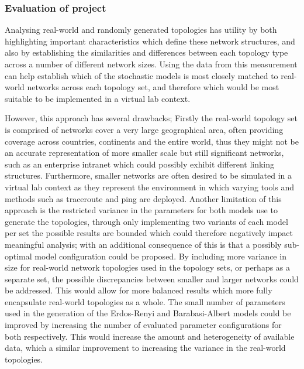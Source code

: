\subsubsection{Evaluation of project}
Analysing real-world and randomly generated topologies has utility by both highlighting important characteristics which define these network structures, and also by establishing the similarities and differences between each topology type across a number of different network sizes. Using the data from this measurement can help establish which of the stochastic models is most closely matched to real-world networks across each topology set, and therefore which would be most suitable to be implemented in a virtual lab context. 

However, this approach has several drawbacks; Firstly the real-world topology set is comprised of networks cover a very large geographical area, often providing coverage across countries, continents and the entire world, thus they might not be an accurate representation of more smaller scale but still significant networks, such as an enterprise intranet which could possibly exhibit different linking structures. Furthermore, smaller networks are often desired to be simulated in a virtual lab context as they represent the environment in which varying tools and methods such as traceroute \cite{jacobson1989traceroute} and ping are deployed. Another limitation of this approach is the restricted variance in the parameters for both models use to generate the topologies, through only implementing two variants of each model per set the possible results are bounded which could therefore negatively impact meaningful analysis; with an additional consequence of this is that a possibly sub-optimal model configuration could be proposed. By including more variance in size for real-world network topologies used in the topology sets, or perhaps as a separate set, the possible discrepancies between smaller and larger networks could be addressed. This would allow for more balanced results which more fully encapsulate real-world topologies as a whole. The small number of parameters used in the generation of the Erdos-Renyi and Barabasi-Albert models could be improved by increasing the number of evaluated parameter configurations for both respectively. This would increase the amount and heterogeneity of available data, which a similar improvement to increasing the variance in the real-world topologies. 

